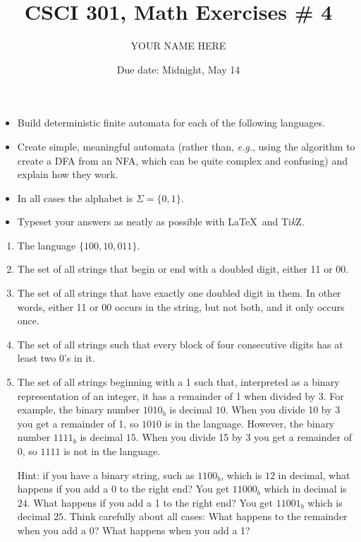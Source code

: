 \documentclass{article}
\title{CSCI 301, Math Exercises \# 4}
\author{YOUR NAME HERE}
\date{Due date:  Midnight, May 14}
\begin{document}
\maketitle

\begin{itemize}
  \item
Build deterministic finite automata
for each of the following languages.
\item
Create simple, meaningful automata
(rather than, {\em e.g.}, using the algorithm to create
a DFA from an NFA, which can be quite complex and confusing)
and explain how they work.
\item
In all
cases the alphabet is $\Sigma = \{0,1\}$.
\item
  Typeset your answers as neatly as possible with \LaTeX\ and
  Ti\textit{k}Z.
\end{itemize}

\begin{enumerate}

  \item   The language $\{100, 10, 011\}$. 

\item The set of 
  all strings that begin or end with a doubled digit, either 11 or 00.
  
\item
The set of all strings that have exactly one doubled digit in them.
  In other words, either 11 or 00 occurs in the string, but not both,
  and it only occurs once.

\item The set of all strings such that every block of four consecutive
  digits has at least two 0's in it.

\item The set of all strings beginning with a 1 such
  that, interpreted as a binary representation of an integer, it has a
  remainder of 1 when divided by 3.  For example, the binary number
  $1010_b$ is decimal $10$.  When you divide 10 by 3 you get a
  remainder of 1, so $1010$ is in the language.  However, the binary
  number $1111_b$ is decimal $15$.  When you divide 15 by 3 you get a
  remainder of 0, so $1111$ is not in the language.

  Hint: if you have a binary string, such as $1100_b$, which is
  $12$ in decimal, what happens if you add a 0 to the right end?
  You get $11000_b$ which in decimal is $24$.  What happens if
  you add a 1 to the right end?  You get $11001_b$ which is decimal
  $25$.  Think carefully about all cases:  What happens to the remainder
  when you add a 0?  What happens when you add a 1?

\end{enumerate}
\end{document}
